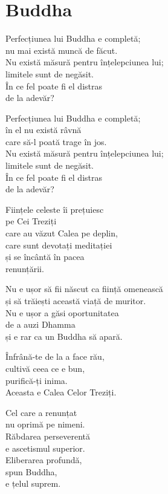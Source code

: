 
\chapter{Buddha}


Perfecțiunea lui Buddha e completă;\\
nu mai există muncă de făcut.\\
Nu există măsură pentru înțelepciunea lui;\\
limitele sunt de negăsit.\\
În ce fel poate fi el distras\\
de la adevăr?


Perfecțiunea lui Buddha e completă;\\
în el nu există râvnă\\
care să-l poată trage în jos.\\
Nu există măsură pentru înțelepciunea lui;\\
limitele sunt de negăsit.\\
În ce fel poate fi el distras\\
de la adevăr?


Ființele celeste îi prețuiesc\\
pe Cei Treziți\\
care au văzut Calea pe deplin,\\
care sunt devotați meditației\\
și se încântă în pacea\\
renunțării.


Nu e ușor să fii născut ca ființă omenească\\
și să trăiești această viață de muritor.\\
Nu e ușor a găsi oportunitatea\\
de a auzi Dhamma\\
și e rar ca un Buddha să apară.


Înfrână-te de la a face rău,\\
cultivă ceea ce e bun,\\
purifică-ți inima.\\
Aceasta e Calea Celor Treziți.


Cel care a renunțat\\
nu oprimă pe nimeni.\\
Răbdarea perseverentă\\
e ascetismul superior.\\
Eliberarea profundă,\\
spun Buddha,\\
e țelul suprem.


